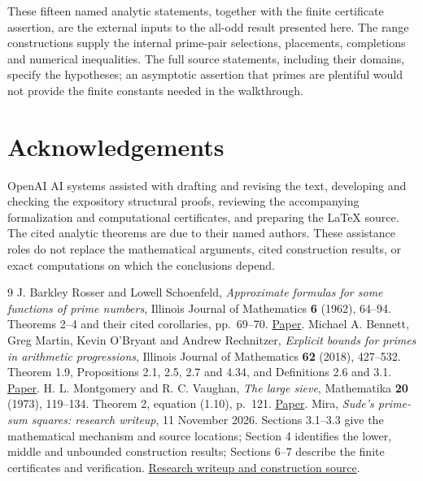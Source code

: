 \documentclass[11pt]{article}
\theoremstyle{definition}
\begin{document}
These fifteen named analytic statements, together with the finite certificate
assertion, are the external inputs to the all-odd result presented here.
The range constructions supply the internal prime-pair selections, placements,
completions and numerical inequalities. The full source statements, including
their domains, specify the hypotheses; an asymptotic assertion that primes
are plentiful would not provide the finite constants needed in the walkthrough.

\section*{Acknowledgements}
OpenAI AI systems assisted with drafting and revising the text, developing and
checking the expository structural proofs, reviewing the accompanying
formalization and computational certificates, and preparing the LaTeX source.
The cited analytic theorems are due to their named authors. These assistance
roles do not replace the mathematical arguments, cited construction results,
or exact computations on which the conclusions depend.

\begin{thebibliography}{9}
J. Barkley Rosser and Lowell Schoenfeld,
\emph{Approximate formulas for some functions of prime numbers},
Illinois Journal of Mathematics \textbf{6} (1962), 64--94.
Theorems 2--4 and their cited corollaries, pp.~69--70.
\href{https://denisevellachemla.eu/Rosser-Schoenfeld-1962.pdf}{Paper}.
Michael A. Bennett, Greg Martin, Kevin O'Bryant and Andrew Rechnitzer,
\emph{Explicit bounds for primes in arithmetic progressions},
Illinois Journal of Mathematics \textbf{62} (2018), 427--532.
Theorem 1.9, Propositions 2.1, 2.5, 2.7 and 4.34, and Definitions 2.6 and 3.1.
\href{https://personal.math.ubc.ca/~bennett/BeMaObRe-IJM-2018.pdf}{Paper}.
H. L. Montgomery and R. C. Vaughan,
\emph{The large sieve}, Mathematika \textbf{20} (1973), 119--134.
Theorem 2, equation (1.10), p.~121.
\href{https://personal.science.psu.edu/rcv4/personal/Publications/large_sieve.pdf}{Paper}.
Mira, \emph{Sude's prime-sum squares: research writeup}, 11 November 2026.
Sections 3.1--3.3 give the mathematical mechanism and source locations;
Section 4 identifies the lower, middle and unbounded construction results;
Sections 6--7 describe the finite certificates and verification.
\href{https://github.com/Mira-Cult/math/blob/d16fd1ee2dd6f8440c6c47b1b7575d0fca8b4241/notes/sudes-first-conjecture/research-writeup.md}{Research writeup and construction source}.
\end{thebibliography}
\end{document}
